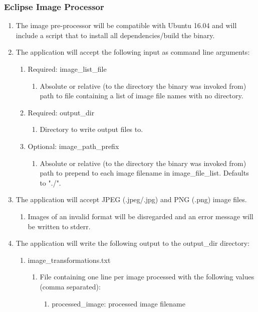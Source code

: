 \documentclass[10pt, onecolumn, draftclsnofoot, letterpaper, compsoc]{IEEEtran}
\begin{document}
\subsubsection{Eclipse Image Processor}
	\begin{enumerate}
		\item The image pre-processor will be compatible with Ubuntu 16.04 and
		 will include a script that to install all dependencies/build the 
		 binary.

		 \item The application will accept the following input as command line
		 arguments:
		 \begin{enumerate}
		 	\item Required: image\_list\_file
		 		\begin{enumerate}
		 			\item Absolute or relative (to the directory the binary was 
		 			invoked from) path to file containing a list of image file 
		 			names with no directory.
		 		\end{enumerate}

		 	\item Required: output\_dir
		 		\begin{enumerate}
		 			\item Directory to write output files to.
		 		\end{enumerate}

		 	\item Optional: image\_path\_prefix
		 		\begin{enumerate}
		 			\item Absolute or relative (to the directory the binary was
		 			 invoked from) path to prepend to each image filename in 
		 			 image\_file\_list. Defaults to "./".
		 		\end{enumerate}
		 \end{enumerate}

		 \item The application will accept JPEG (.jpeg/.jpg) and PNG (.png) 
		 image files.
		 \begin{enumerate}
		 	\item Images of an invalid format will be disregarded and an error
		 	 message will be written to stderr.
		 \end{enumerate}

		 \item The application will write the following output to the 
		 output\_dir directory:
		 \begin{enumerate}
		 	\item image\_transformations.txt
		 	\begin{enumerate}
		 		\item File containing one line per image processed with the 
		 		following values (comma separated):
		 		\begin{enumerate}
		 			\item processed\_image: processed image filename


\end{enumerate}
\end{enumerate}
\end{enumerate}
\end{enumerate}
\end{document}
